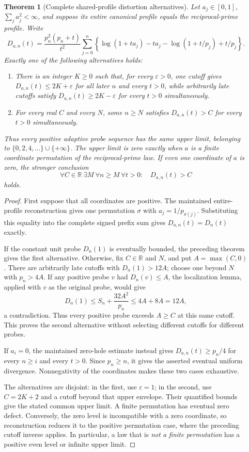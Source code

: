 \documentclass[11pt]{article}
\newtheorem{theorem}{Theorem}[section]
\theoremstyle{definition}
\begin{document}
\begin{theorem}[Complete shared-profile distortion alternatives]
Let $a_j\in[0,1]$, $\sum_j a_j^2<\infty$, and suppose its entire
canonical profile equals the reciprocal-prime profile.
Write
\[
 D_{a,n}(t)=\frac{p_n^2(p_n+t)}{t^2}
 \sum_{j=0}^{n}
 \left\{\log(1+ta_j)-ta_j-\log(1+t/p_j)+t/p_j\right\}.
\]
Exactly one of the following alternatives holds:
\begin{enumerate}
\item There is an integer $K\ge0$ such that, for every $\varepsilon>0$,
one cutoff gives $D_{a,n}(t)\le2K+\varepsilon$ for all later $n$
and every $t>0$, while arbitrarily late cutoffs satisfy
$D_{a,n}(t)\ge2K-\varepsilon$ for every $t>0$ simultaneously.
\item For every real $C$ and every $N$, some $n\ge N$ satisfies
$D_{a,n}(t)>C$ for every $t>0$ simultaneously.
\end{enumerate}
Thus every positive adaptive probe sequence has the same upper limit,
belonging to $\{0,2,4,\ldots\}\cup\{+\infty\}$.
The upper limit is zero exactly when $a$ is a finite coordinate
permutation of the reciprocal-prime law.
If even one coordinate of $a$ is zero, the stronger conclusion
\[
 \forall C\in\mathbb R\ \exists M\
 \forall n\ge M\ \forall t>0:\quad D_{a,n}(t)>C
\]
holds.
\end{theorem}
\begin{proof}
First suppose that all coordinates are positive. The maintained entire-profile
reconstruction gives one permutation $\sigma$ with
$a_j=1/p_{\sigma(j)}$. Substituting this equality into the complete signed
prefix sum gives $D_{a,n}(t)=D_n(t)$ exactly.

If the constant unit probe $D_n(1)$ is eventually bounded, the preceding
theorem gives the first alternative. Otherwise, fix $C\in\mathbb R$ and
$N$, and put $A=\max(C,0)$. There are arbitrarily late cutoffs with
$D_n(1)>12A$; choose one beyond $N$ with $p_n>4A$.
If any positive probe $v$ had $D_n(v)\le A$, the localization lemma,
applied with $v$ as the original probe, would give
\[
 D_n(1)\le S_n+\frac{32A^2}{p_n}
          \le4A+8A=12A,
\]
a contradiction. Thus every positive probe exceeds $A\ge C$ at this
same cutoff. This proves the second alternative without selecting
different cutoffs for different probes.

If $a_i=0$, the maintained zero-hole estimate instead gives
$D_{a,n}(t)\ge p_n/4$ for every $n\ge i$ and every $t>0$.
Since $p_n\ge n$, it gives the asserted eventual uniform divergence.
Nonnegativity of the coordinates makes these two cases exhaustive.

The alternatives are disjoint: in the first, use $\varepsilon=1$;
in the second, use $C=2K+2$ and a cutoff beyond that upper envelope.
Their quantified bounds give the stated common upper limit.
A finite permutation has eventual zero defect. Conversely, the zero
level is incompatible with a zero coordinate, so reconstruction reduces
it to the positive permutation case, where the preceding cutoff inverse
applies. In particular, a law that is \emph{not a finite permutation}
has a positive even level or infinite upper limit.
\end{proof}
\end{document}
